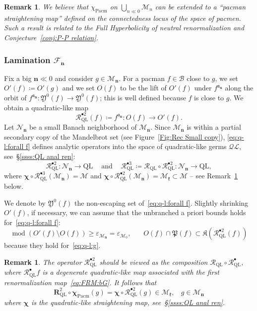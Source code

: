 \documentclass{amsart}
\renewcommand{\sp}{{\ \ }}
\newcommand{\1}{{\mathbb 1 }}
\newcommand\NN{\mathcal{N}}
\newcommand{\Mandel}{{\mathcal{M}}}
\newcommand\MM{\mathscr{M}}
\newcommand\bMM{{\pmb {\MM}}}
\newcommand\RR{\mathcal{R}}
\newcommand\mRR{\boldsymbol R}%
\newcommand\Kfilled{{\mathfrak K}}
\newcommand\Post{{\mathfrak P}}
\newcommand\frakY{{\mathfrak Y}}
\newcommand{\bbn}{{\mathbf n}}
\renewcommand{\aa}{\mathfrak{a}}
\newcommand{\kk}{\mathfrak{k}}
\newcommand\strai{{\boldsymbol \chi}}
\newcommand\BB{\mathcal{B}}
\newcommand\Pacm{{\operatorname{Pacm}}}
\newcommand{\bFol}{{\boldsymbol{ \mathcal F}}}
\newtheorem{rem}[thm]{Remark}
\theoremstyle{remark}
\numberwithin{equation}{section}
\theoremstyle{definition}
\def\QL{{\text{QL}}}
\newcommand{\QG}{{\mathcal {QL}}}
\renewcommand{\mod}{\operatorname{mod}}
\newcommand{\bchi}{{\boldsymbol{ \chi}}}
\theoremstyle{nonumberbreak}
\begin{document}
\begin{rem}
\label{rem: pacman str map}
We believe that $\chi_\Pacm$ on $\displaystyle{\bigcup_{n\ll 0} \MM_n}$ can be extended to a ``pacman straightening map'' defined on the connectedness locus of the space of pacmen. Such a result is related to the Full Hyperbolicity of neutral renormalization and Conjecture~\ref{conj:P-P relation}.
\end{rem}


\subsubsection{Lamination $\bFol_\bbn$}
Fix a big $\bbn\ll0$ and consider $g\in \MM_\bbn$. For a pacman $f\in \BB$ close to $g$, we set $O'(f)\coloneqq O'(g)$ and we set $O(f)$ to be the lift of $O'(f)$ under $f^{\aa_\bbn}$ along the orbit of $f^{\aa_\bbn}\colon \frakY^0(f)\to \frakY^0(f)$; this is well defined because $f$ is close to $g$. We obtain a quadratic-like map
\begin{equation}
\label{eq:q-l:forall f}
\RR_{\QL}^{\bullet 2} (f)\coloneqq f^{\aa_\bbn}\colon O(f)\to  O'(f).
\end{equation} Let $\NN_\bbn$ be a small Banach neighborhood of $\MM_\bbn$. Since $\MM_\bbn$ is within a partial secondary copy of the Mandelbrot set (see Figure~\ref{Fig:Rec Small copy}), \eqref{eq:q-l:forall f} defines analytic operators into the space of quadratic-like germs $\QG$, see~\S\ref{ssss:QL anal ren}: 
\[\RR_{\QL}^{\bullet 2}\colon \NN_\bbn \to \QL \sp\sp \text{ and }\sp\sp \RR_{\QL}^{\bullet 3}\coloneqq \RR_{\QL}\circ \RR_{\QL}^{\bullet 2}\colon \NN_\bbn \to \QL,\]
where $\bchi\circ \RR_{\QL}^{\bullet 3} (\MM_\bbn) =\Mandel$ and $\bchi\circ \RR_{\QL}^{\bullet 2} (\MM_\bbn)=\Mandel_\kk\subset \Mandel$ -- see Remark~\ref{rem:RR_QL^2:strai} below.



We denote by $\frakY^0(f)$ the non-escaping set of~\eqref{eq:q-l:forall f}. Slightly shrinking $O'(f)$, if necessary, we can assume that the unbranched a priori bounds holds for~\eqref{eq:q-l:forall f}:
\[ \mod \left( O'(f)\setminus  O(f)\right)\ge \varepsilon_{\MM_\bbn}=\varepsilon_{\bMM_0},\sp\sp\sp\sp O(f)\cap \Post(f)\subset \Kfilled \left(\RR_{\QL}^{\bullet 2} (f)\right)\]
 because they hold for~\eqref{eq:q-l:g}.

\begin{rem}
\label{rem:RR_QL^2:strai}
The operator $\RR_{\QL}^{\bullet 2} $ should be viewed as the composition $\RR_\QL\circ \RR_{\QL}^{\bullet}$, where $ \RR_{\QL}^{\bullet} f$ is a degenerate quadratic-like map associated with the first renormalization map~\eqref{eq:FRM:bG}. It follows that  
\begin{equation}
\label{eq:RR_QL^2:strai}
 \mRR_{\QL}^2\circ \strai_{\Pacm}(g)= \strai \circ \RR_\QL^{\bullet 2}(g)\in \Mandel_\kk,\sp\sp g\in \MM_\bbn
\end{equation}
where $\strai$ is the quadratic-like straightening map, see~\S\ref{ssss:QL anal ren}.
\end{rem}
\end{document}
